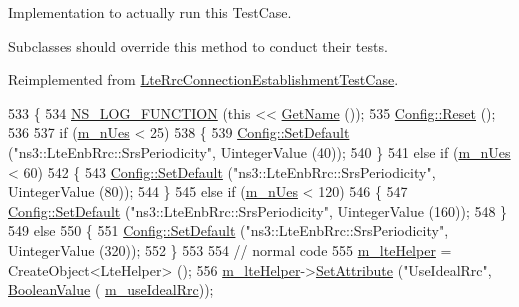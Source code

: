 Implementation to actually run this Test\+Case. 

Subclasses should override this method to conduct their tests. 

Reimplemented from \hyperlink{classLteRrcConnectionEstablishmentTestCase_a2c32cab9b29852f42c4ad1e7b68068b2}{Lte\+Rrc\+Connection\+Establishment\+Test\+Case}.


\begin{DoxyCode}
533 \{
534   \hyperlink{log-macros-disabled_8h_a90b90d5bad1f39cb1b64923ea94c0761}{NS\_LOG\_FUNCTION} (\textcolor{keyword}{this} << \hyperlink{classns3_1_1TestCase_a28f7bb59669c24dae1c290fc17fc9b62}{GetName} ());
535   \hyperlink{group__config_ga2c1b65724f42f8c72276d7e7ad6df6db}{Config::Reset} ();
536 
537   \textcolor{keywordflow}{if} (\hyperlink{classLteRrcConnectionEstablishmentTestCase_a402354f3bb0e71f08f711f4f27cd8fd4}{m\_nUes} < 25)
538     \{
539       \hyperlink{group__config_ga2e7882df849d8ba4aaad31c934c40c06}{Config::SetDefault} (\textcolor{stringliteral}{"ns3::LteEnbRrc::SrsPeriodicity"}, UintegerValue (40));
540     \}
541   \textcolor{keywordflow}{else} \textcolor{keywordflow}{if} (\hyperlink{classLteRrcConnectionEstablishmentTestCase_a402354f3bb0e71f08f711f4f27cd8fd4}{m\_nUes} < 60)
542     \{
543       \hyperlink{group__config_ga2e7882df849d8ba4aaad31c934c40c06}{Config::SetDefault} (\textcolor{stringliteral}{"ns3::LteEnbRrc::SrsPeriodicity"}, UintegerValue (80));
544     \}
545   \textcolor{keywordflow}{else} \textcolor{keywordflow}{if} (\hyperlink{classLteRrcConnectionEstablishmentTestCase_a402354f3bb0e71f08f711f4f27cd8fd4}{m\_nUes} < 120)
546     \{
547       \hyperlink{group__config_ga2e7882df849d8ba4aaad31c934c40c06}{Config::SetDefault} (\textcolor{stringliteral}{"ns3::LteEnbRrc::SrsPeriodicity"}, UintegerValue (160));
548     \}
549   \textcolor{keywordflow}{else}
550     \{
551       \hyperlink{group__config_ga2e7882df849d8ba4aaad31c934c40c06}{Config::SetDefault} (\textcolor{stringliteral}{"ns3::LteEnbRrc::SrsPeriodicity"}, UintegerValue (320));
552     \}
553 
554   \textcolor{comment}{// normal code}
555   \hyperlink{classLteRrcConnectionEstablishmentTestCase_a8b3adef98e6fbb2d1a88c98aba524a4e}{m\_lteHelper} = CreateObject<LteHelper> ();
556   \hyperlink{classLteRrcConnectionEstablishmentTestCase_a8b3adef98e6fbb2d1a88c98aba524a4e}{m\_lteHelper}->\hyperlink{classns3_1_1ObjectBase_ac60245d3ea4123bbc9b1d391f1f6592f}{SetAttribute} (\textcolor{stringliteral}{"UseIdealRrc"}, \hyperlink{classns3_1_1BooleanValue}{BooleanValue} (
      \hyperlink{classLteRrcConnectionEstablishmentTestCase_a631ad66c06ee736fee379d5eddd16589}{m\_useIdealRrc}));

\end{DoxyCode}
